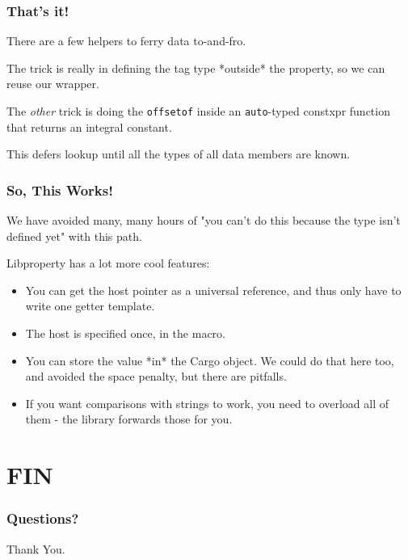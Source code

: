 \documentclass{beamer}
\def\code#1{\texttt{#1}}
\newcommand{\nl}{\vspace{0.2\baselineskip}}
\begin{document}
\begin{frame}[fragile]
\frametitle{That's it!}
\begin{center}
  There are a few helpers to ferry data to-and-fro.\nl\nl\nl

  The trick is really in defining the tag type *outside* the property, so we can
  reuse our wrapper. \nl\nl\nl

  The \emph{other} trick is doing the \code{offsetof} inside an
  \code{auto}-typed constxpr function that returns an integral
  constant.\nl\nl\nl

  This defers lookup until all the types of all data members are known.
\end{center}
\end{frame}


\begin{frame}[fragile]
\frametitle{So, This Works!}
\begin{center}
  We have avoided many, many hours of "you can't do this because the type isn't
  defined yet" with this path.\nl\nl\nl

  Libproperty has a lot more cool features:
\end{center}
\begin{itemize}
  \item You can get the host pointer as a universal reference, and thus only
    have to write one getter template.
  \item The host is specified once, in the macro.
  \item You can store the value *in* the Cargo object. We could do that here
    too, and avoided the space penalty, but there are pitfalls.
  \item If you want comparisons with strings to work, you need to overload all
    of them - the library forwards those for you.
\end{itemize}
\end{frame}

\section{FIN}

\begin{frame}[fragile]
\frametitle{Questions?}
\begin{center}
  {\Huge Thank You.}
\end{center}
\end{frame}
\end{document}
